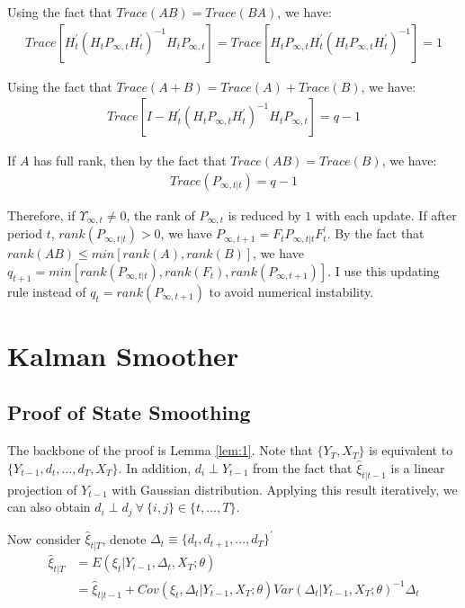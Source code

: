 \documentclass[10pt]{article}
\numberwithin{equation}{section}
\begin{document}
Using the fact that $Trace(AB)=Trace(BA)$, we have:
\begin{align*}
    Trace[H_t^{'}(H_tP_{\infty,t}H_t^{'})^{-1}H_tP_{\infty,t}] = Trace[H_tP_{\infty,t}H_t^{'}(H_tP_{\infty,t}H_t^{'})^{-1}] = 1
\end{align*}

Using the fact that $Trace(A+B) = Trace(A) + Trace(B)$, we have:
\begin{align*}
    Trace[I - H_t^{'}(H_tP_{\infty,t}H_t^{'})^{-1}H_tP_{\infty,t}]=q-1
\end{align*}

If $A$ has full rank, then by the fact that $Trace(AB)=Trace(B)$, we have:
\begin{align*}
    Trace(P_{\infty,t|t}) = q-1
\end{align*}

Therefore, if $\Upsilon_{\infty,t}\neq0$, the rank of $P_{\infty,t}$ is reduced by $1$ with each update. If after period $t$, $rank(P_{\infty,t|t})>0$, we have $P_{\infty,t+1} = F_tP_{\infty,t|t}F_t^{'}$. By the fact that $rank(AB)\leq min[rank(A), rank(B)]$, we have $q_{t+1}=min[rank(P_{\infty,t|t}),rank(F_t), rank(P_{\infty,t+1})]$. I use this updating rule instead of $q_{t} = rank(P_{\infty,t+1})$ to avoid numerical instability. 

\section{Kalman Smoother}
\subsection{Proof of State Smoothing} \label{ap:smooth}
The backbone of the proof is Lemma \ref{lem:1}. Note that $\{Y_T, X_T\}$ is equivalent to $\{Y_{t-1},d_t,...,d_T, X_T\}$. In addition, $d_i \perp Y_{t-1}$ from the fact that $\hat{\xi}_{t|t-1}$ is a linear projection of $Y_{t-1}$ with Gaussian distribution. Applying this result iteratively, we can also obtain $d_i \perp d_j \:\forall\: \{i,j\} \in \{t,...,T\}$.

Now consider $\hat{\xi}_{t|T}$, denote $\Delta_t\equiv\{d_t,d_{t+1},...,d_T\}^{'}$ 
\begin{align*}
    \hat{\xi}_{t|T} &= E(\xi_t|Y_{t-1},\Delta_{t},X_T;\theta) \\
    &= \hat{\xi}_{t|t-1} + Cov(\xi_t,\Delta_t|Y_{t-1},X_T;\theta)Var(\Delta_t|Y_{t-1},X_T;\theta)^{-1}\Delta_t
\end{align*}
\end{document}
